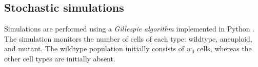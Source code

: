 \documentclass[12pt]{extarticle}
\begin{document}

\subsection*{Stochastic simulations} 
Simulations are performed using a \emph{Gillespie algorithm} \citep{gillespie1976general,gillespie1977exact} implemented in Python \citep{python}.
The simulation monitors the number of cells of each type: wildtype, aneuploid, and mutant. 
The wildtype population initially consists of $w_0$ cells, whereas the other cell types are initially absent.
\end{document}
